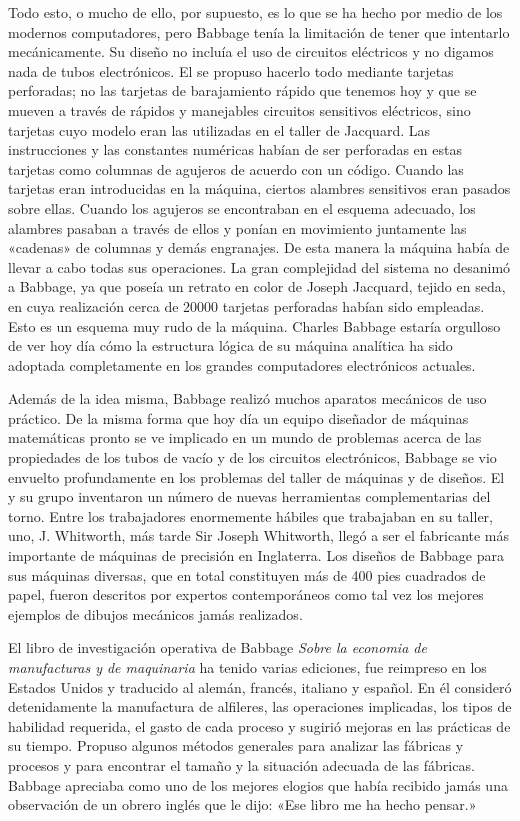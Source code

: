 \documentclass[a4paper, 12pt]{article}
\begin{document}
Todo esto, o mucho de ello, por supuesto, es lo que se ha hecho por medio de los modernos computadores, pero Babbage tenía la limitación de tener que intentarlo mecánicamente. Su diseño no incluía el uso de circuitos eléctricos y no digamos nada de tubos electrónicos. El se propuso hacerlo todo mediante tarjetas perforadas; no las tarjetas de barajamiento rápido que tenemos hoy y que se mueven a través de rápidos y manejables circuitos sensitivos eléctricos, sino tarjetas cuyo modelo eran las utilizadas en el taller de Jacquard. Las instrucciones y las constantes numéricas habían de ser perforadas en estas tarjetas como columnas de agujeros de acuerdo con un código. Cuando las tarjetas eran introducidas en la máquina, ciertos alambres sensitivos eran pasados sobre ellas. Cuando los agujeros se encontraban en el esquema adecuado, los alambres pasaban a través de ellos y ponían en movimiento juntamente las «cadenas» de columnas y demás engranajes. De esta manera la máquina había de llevar a cabo todas sus operaciones. La gran complejidad del sistema no desanimó a Babbage, ya que poseía un retrato en color de Joseph Jacquard, tejido en seda, en cuya realización cerca de 20000 tarjetas perforadas habían sido empleadas. Esto es un esquema muy rudo de la máquina. Charles Babbage estaría orgulloso de ver hoy día cómo la estructura lógica de su máquina analítica ha sido adoptada completamente en los grandes computadores electrónicos actuales.

Además de la idea misma, Babbage realizó muchos aparatos mecánicos de uso  práctico. De la misma forma que hoy día un equipo diseñador de máquinas matemáticas pronto se ve implicado en un mundo de problemas acerca de las propiedades de los tubos de vacío y de los circuitos electrónicos, Babbage se vio envuelto profundamente en los problemas del taller de máquinas y de diseños. El y su grupo inventaron un número de nuevas herramientas complementarias del torno. Entre los trabajadores enormemente hábiles que trabajaban en su taller, uno, J. Whitworth, más tarde Sir Joseph Whitworth, llegó a ser el fabricante más
importante de máquinas de precisión en Inglaterra. Los diseños de Babbage para sus máquinas diversas, que en total constituyen más de 400 pies cuadrados de papel, fueron descritos por expertos contemporáneos como tal vez los mejores ejemplos de dibujos mecánicos jamás realizados.

El libro de investigación operativa de Babbage {\it Sobre la economia de manufacturas y de maquinaria} ha tenido varias ediciones, fue reimpreso en los Estados Unidos y traducido al alemán, francés, italiano y español. En él consideró detenidamente la manufactura de alfileres, las operaciones implicadas, los tipos de habilidad requerida, el gasto de cada proceso y sugirió mejoras en las prácticas de su tiempo. Propuso algunos métodos generales para analizar las fábricas y procesos y para encontrar el tamaño y la situación adecuada de las fábricas. Babbage apreciaba como uno de los mejores elogios que había recibido jamás una observación de un obrero inglés que le dijo: «Ese libro me ha hecho pensar.»
\end{document}
